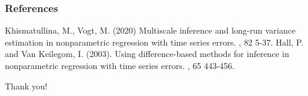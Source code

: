 \documentclass[10pt, handout]{beamer}
\begin{document}
\begin{frame}%
  \frametitle<presentation>{References}    
  \begin{thebibliography}{10}    
  \beamertemplatearticlebibitems
    Khismatullina, M., Vogt, M. (2020)
    \newblock Multiscale inference and long-run variance estimation in nonparametric regression with time series errors.
    , 82 5-37.
  Hall, P. and Van Keilegom, I. (2003).
  \newblock Using difference-based methods for inference in nonparametric regression with time series errors.
    , 65 443-456.
  \end{thebibliography}
\end{frame}

\begin{frame}[standout]
  Thank you!
\end{frame}




\appendix
\end{document}
